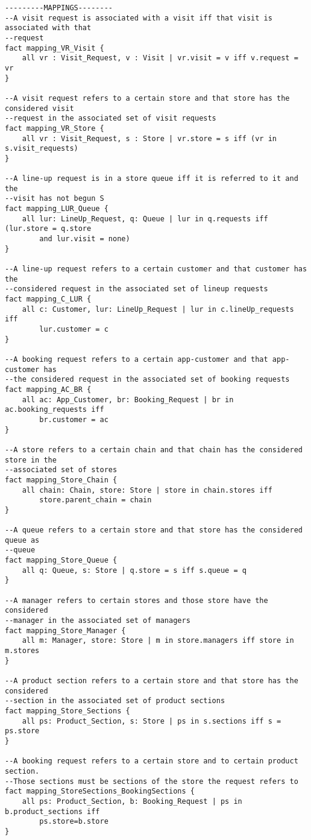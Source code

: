 \begin{lstlisting}[language=alloy]
---------MAPPINGS--------
--A visit request is associated with a visit iff that visit is associated with that
--request
fact mapping_VR_Visit {
    all vr : Visit_Request, v : Visit | vr.visit = v iff v.request = vr
}

--A visit request refers to a certain store and that store has the considered visit 
--request in the associated set of visit requests
fact mapping_VR_Store {
    all vr : Visit_Request, s : Store | vr.store = s iff (vr in s.visit_requests)
}

--A line-up request is in a store queue iff it is referred to it and the
--visit has not begun S
fact mapping_LUR_Queue {
    all lur: LineUp_Request, q: Queue | lur in q.requests iff (lur.store = q.store
        and lur.visit = none)
}

--A line-up request refers to a certain customer and that customer has the 
--considered request in the associated set of lineup requests
fact mapping_C_LUR {
    all c: Customer, lur: LineUp_Request | lur in c.lineUp_requests iff 
        lur.customer = c
}

--A booking request refers to a certain app-customer and that app-customer has
--the considered request in the associated set of booking requests
fact mapping_AC_BR {
    all ac: App_Customer, br: Booking_Request | br in ac.booking_requests iff 
        br.customer = ac
}

--A store refers to a certain chain and that chain has the considered store in the
--associated set of stores
fact mapping_Store_Chain {
    all chain: Chain, store: Store | store in chain.stores iff 
        store.parent_chain = chain
}

--A queue refers to a certain store and that store has the considered queue as 
--queue
fact mapping_Store_Queue {
    all q: Queue, s: Store | q.store = s iff s.queue = q
}

--A manager refers to certain stores and those store have the considered 
--manager in the associated set of managers
fact mapping_Store_Manager {
    all m: Manager, store: Store | m in store.managers iff store in m.stores
}

--A product section refers to a certain store and that store has the considered 
--section in the associated set of product sections
fact mapping_Store_Sections {
    all ps: Product_Section, s: Store | ps in s.sections iff s = ps.store
}

--A booking request refers to a certain store and to certain product section. 
--Those sections must be sections of the store the request refers to
fact mapping_StoreSections_BookingSections {
    all ps: Product_Section, b: Booking_Request | ps in b.product_sections iff 
        ps.store=b.store 
}



\end{lstlisting}
